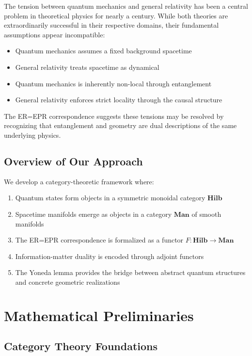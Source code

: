 \documentclass[11pt,a4paper]{article}
\newcommand{\Cat}[1]{\mathbf{#1}}
\newcommand{\Hilb}{\Cat{Hilb}}
\newcommand{\Man}{\Cat{Man}}
\begin{document}
The tension between quantum mechanics and general relativity has been a central problem in theoretical physics for nearly a century. While both theories are extraordinarily successful in their respective domains, their fundamental assumptions appear incompatible:

\begin{itemize}
\item Quantum mechanics assumes a fixed background spacetime
\item General relativity treats spacetime as dynamical
\item Quantum mechanics is inherently non-local through entanglement
\item General relativity enforces strict locality through the causal structure
\end{itemize}

The ER=EPR correspondence suggests these tensions may be resolved by recognizing that entanglement and geometry are dual descriptions of the same underlying physics.

\subsection{Overview of Our Approach}

We develop a category-theoretic framework where:
\begin{enumerate}
\item Quantum states form objects in a symmetric monoidal category $\Hilb$
\item Spacetime manifolds emerge as objects in a category $\Man$ of smooth manifolds
\item The ER=EPR correspondence is formalized as a functor $F: \Hilb \to \Man$
\item Information-matter duality is encoded through adjoint functors
\item The Yoneda lemma provides the bridge between abstract quantum structures and concrete geometric realizations
\end{enumerate}

\section{Mathematical Preliminaries}

\subsection{Category Theory Foundations}
\end{document}
